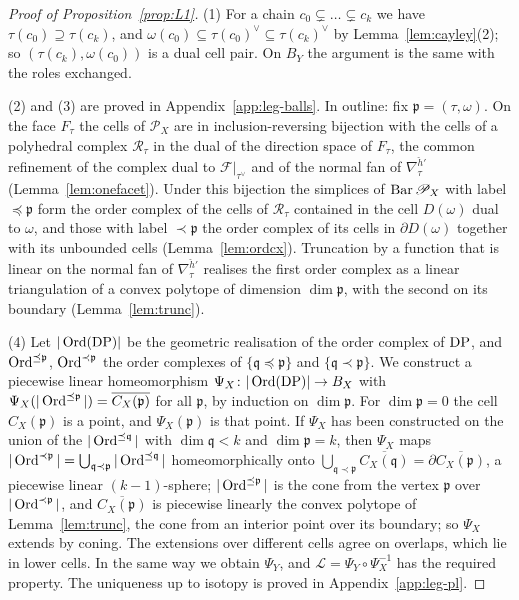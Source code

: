 \begin{proof}[Proof of Proposition~\ref{prop:L1}]
(1) For a chain $c_0\subsetneq\dots\subsetneq c_k$ we have $\tau(c_0)\supseteq\tau(c_k)$, and
$\omega(c_0)\subseteq\tau(c_0)^\vee\subseteq\tau(c_k)^\vee$ by Lemma~\ref{lem:cayley}(2); so $(\tau(c_k),\omega(c_0))$ is a
dual cell pair. On $B_Y$ the argument is the same with the roles exchanged.

(2) and (3) are proved in Appendix~\ref{app:leg-balls}. In outline: fix ${\mathfrak p}=(\tau,\omega)$. On the face $F_\tau$ the cells of
$\mathscr P_X$ are in inclusion-reversing bijection with the cells of a polyhedral complex $\mathcal R_\tau$ in the dual
of the direction space of $F_\tau$, the common refinement of the complex dual to $\mathcal F|_{\tau^\vee}$ and of the
normal fan of $\nabla^{\check h'}_\tau$ (Lemma~\ref{lem:onefacet}). Under this bijection the simplices of $\operatorname{Bar}\mathscr
P_X$ with label $\preceq {\mathfrak p}$ form the order complex of the cells of $\mathcal R_\tau$ contained in the cell $D(\omega)$ dual
to $\omega$, and those with label $\prec {\mathfrak p}$ the order complex of its cells in $\partial D(\omega)$ together with its
unbounded cells (Lemma~\ref{lem:ordcx}). Truncation by a function that is linear on the normal fan of $\nabla^{\check
h'}_\tau$ realises the first order complex as a linear triangulation of a convex polytope of dimension $\dim{\mathfrak p}$, with the
second on its boundary (Lemma~\ref{lem:trunc}).

(4) Let $|\operatorname{Ord}(\mathrm{DP})|$ be the geometric realisation of the order complex of $\mathrm{DP}$, and $\operatorname{Ord}^{\preceq {\mathfrak p}}$,
$\operatorname{Ord}^{\prec {\mathfrak p}}$ the order complexes of $\{{\mathfrak q}\preceq {\mathfrak p}\}$ and $\{{\mathfrak q}\prec {\mathfrak p}\}$. We construct a piecewise linear
homeomorphism $\Psi_X\colon|\operatorname{Ord}(\mathrm{DP})|\to B_X$ with $\Psi_X(|\operatorname{Ord}^{\preceq {\mathfrak p}}|)=\overline{C_X({\mathfrak p})}$ for all ${\mathfrak p}$, by
induction on $\dim{\mathfrak p}$. For $\dim{\mathfrak p}=0$ the cell $C_X({\mathfrak p})$ is a point, and $\Psi_X({\mathfrak p})$ is that point. If $\Psi_X$ has been
constructed on the union of the $|\operatorname{Ord}^{\preceq {\mathfrak q}}|$ with $\dim{\mathfrak q}<k$ and $\dim{\mathfrak p}=k$, then $\Psi_X$ maps
$|\operatorname{Ord}^{\prec {\mathfrak p}}|=\bigcup_{{\mathfrak q}\prec {\mathfrak p}}|\operatorname{Ord}^{\preceq {\mathfrak q}}|$ homeomorphically onto $\bigcup_{{\mathfrak q}\prec {\mathfrak p}}\overline{C_X({\mathfrak q})}=
\partial\overline{C_X({\mathfrak p})}$, a piecewise linear $(k-1)$-sphere; $|\operatorname{Ord}^{\preceq {\mathfrak p}}|$ is the cone from the vertex ${\mathfrak p}$ over
$|\operatorname{Ord}^{\prec {\mathfrak p}}|$, and $\overline{C_X({\mathfrak p})}$ is piecewise linearly the convex polytope of Lemma~\ref{lem:trunc}, the cone
from an interior point over its boundary; so $\Psi_X$ extends by coning. The extensions over different cells agree on
overlaps, which lie in lower cells. In the same way we obtain $\Psi_Y$, and $\mathcal L=\Psi_Y\circ\Psi_X^{-1}$ has the
required property. The uniqueness up to isotopy is proved in Appendix~\ref{app:leg-pl}.


\end{proof}
